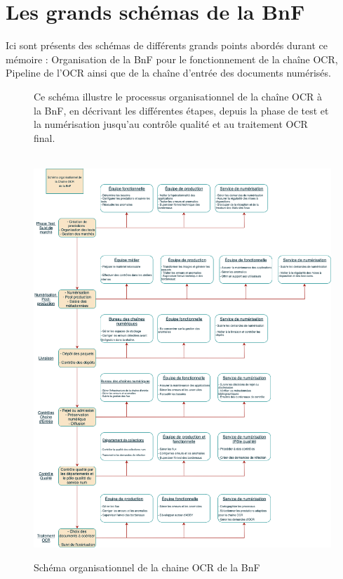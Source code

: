 \documentclass[a4paper,12pt,twoside]{book}
\begin{document}
\chapter{Les grands schémas de la BnF}
Ici sont présents des schémas de différents grands points abordés durant ce mémoire : Organisation de la BnF pour le fonctionnement de la chaîne OCR, Pipeline de l'OCR ainsi que de la chaîne d'entrée des documents numérisés.

\begin{figure}[h!]
	\centering
	\begin{minipage}{0.85\textwidth}
		\small
		Ce schéma illustre le processus organisationnel de la chaîne OCR à la BnF,  en décrivant les différentes étapes, depuis la phase de test et la numérisation jusqu’au contrôle qualité et au traitement OCR final.
	\end{minipage}
	\\
	\medskip
	\includegraphics[width=0.7\linewidth]{images/schem_organ_bnf}
	\caption{Schéma organisationnel de la chaine OCR de la BnF}
	\label{fig:schemorganbnf}
\end{figure}
\end{document}
